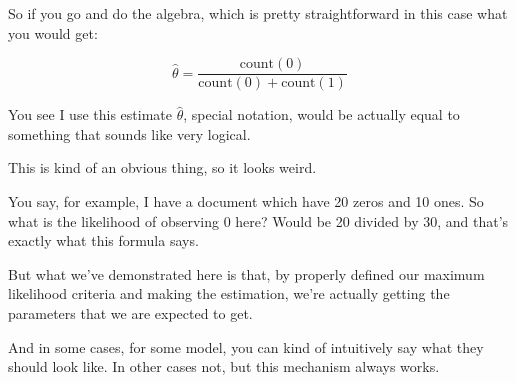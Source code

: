 \documentclass[a4paper, 12pt]{article}
\begin{document}
So if you go and do the algebra, which is pretty straightforward in this case
what you would get:

\begin{equation}
\hat{\theta}=\frac{\text{count}(0)}{\text{count}(0)+\text{count}(1)}
\end{equation}

You see I use this estimate \(\hat{\theta}\), special notation, would be actually
equal to something that sounds like very logical.

This is kind of an obvious thing, so it looks weird.

You say, for example, I have a document which have 20 zeros and 10 ones. So what
is the likelihood of observing \(0\) here? Would be 20 divided by 30, and that's
exactly what this formula says.

But what we've demonstrated here is that, by properly defined our maximum
likelihood criteria and making the estimation, we're actually getting the
parameters that we are expected to get.

And in some cases, for some model, you can kind of intuitively say what they
should look like. In other cases not, but this mechanism always works.
\end{document}
